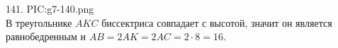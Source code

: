 141. {{PIC:g7-140.png}}\\
В треугольнике $AKC$ биссектриса совпадает с высотой, значит он является равнобедренным и $AB=2AK=2AC=2\cdot8=16.$\\

